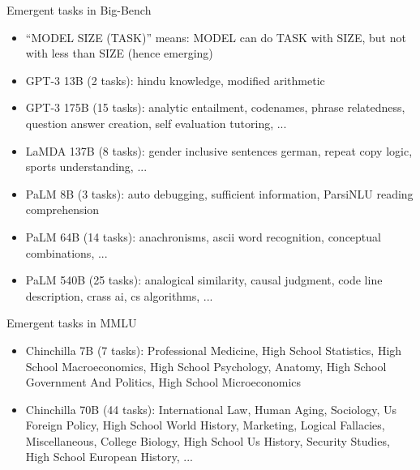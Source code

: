 \documentclass[11pt,compress,t,notes=noshow, xcolor=table]{beamer}
\begin{document}

\begin{frame}{Emergent tasks in Big-Bench}

\vfill

\begin{itemize}
\item ``MODEL SIZE (TASK)'' means: MODEL can do
TASK with SIZE, but not with less than SIZE (hence emerging)
    \item GPT-3 13B (2 tasks): hindu knowledge, modified arithmetic
    \item GPT-3 175B (15 tasks): analytic entailment, codenames, phrase relatedness, question answer creation, self evaluation tutoring, ...
    \item LaMDA 137B (8 tasks): gender inclusive sentences german, repeat copy logic, sports understanding, ...
    \item PaLM 8B (3 tasks): auto debugging, sufficient information, ParsiNLU reading comprehension
    \item PaLM 64B (14 tasks): anachronisms, ascii word recognition, conceptual combinations, ...
    \item PaLM 540B (25 tasks): analogical similarity, causal judgment, code line description, crass ai, cs algorithms, ...
\end{itemize}

\vfill

\end{frame}


\begin{frame}{Emergent tasks in MMLU}

\vfill

\begin{itemize}
    \item Chinchilla 7B (7 tasks): Professional Medicine, High School Statistics, High School Macroeconomics, High School Psychology, Anatomy, High School Government And Politics, High School Microeconomics
    \item Chinchilla 70B (44 tasks): International Law, Human Aging, Sociology, Us Foreign Policy, High School World History, Marketing, Logical Fallacies, Miscellaneous, College Biology, High School Us History, Security Studies, High School European History, ...
\end{itemize}

\vfill

\end{frame}
\end{document}
